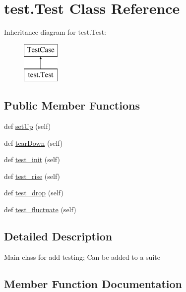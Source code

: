 \hypertarget{classtest_1_1_test}{}\section{test.\+Test Class Reference}
\label{classtest_1_1_test}
Inheritance diagram for test.\+Test\+:\begin{figure}[H]
\begin{center}
\leavevmode
\includegraphics[height=2.000000cm]{classtest_1_1_test}
\end{center}
\end{figure}
\subsection*{Public Member Functions}
\begin{DoxyCompactItemize}
\item 
def \hyperlink{classtest_1_1_test_a277bb47b088805f46287203c1be7be9c}{set\+Up} (self)
\item 
def \hyperlink{classtest_1_1_test_ad3abd1172677087aa32e3703b3dab5a1}{tear\+Down} (self)
\item 
def \hyperlink{classtest_1_1_test_a0901ddee2dfa7c1567dab21e1ebd0876}{test\+\_\+init} (self)
\item 
def \hyperlink{classtest_1_1_test_a28d33532625af81d354c419346579408}{test\+\_\+rise} (self)
\item 
def \hyperlink{classtest_1_1_test_ae12ce961c5c6f1423ce6b7db10cde22d}{test\+\_\+drop} (self)
\item 
def \hyperlink{classtest_1_1_test_ace6036369519138e67fe57cc15111ccc}{test\+\_\+fluctuate} (self)
\end{DoxyCompactItemize}


\subsection{Detailed Description}
\begin{DoxyVerb}Main class for add testing; Can be added to a suite\end{DoxyVerb}
 

\subsection{Member Function Documentation}
\hypertarget{classtest_1_1_test_a277bb47b088805f46287203c1be7be9c}{}
